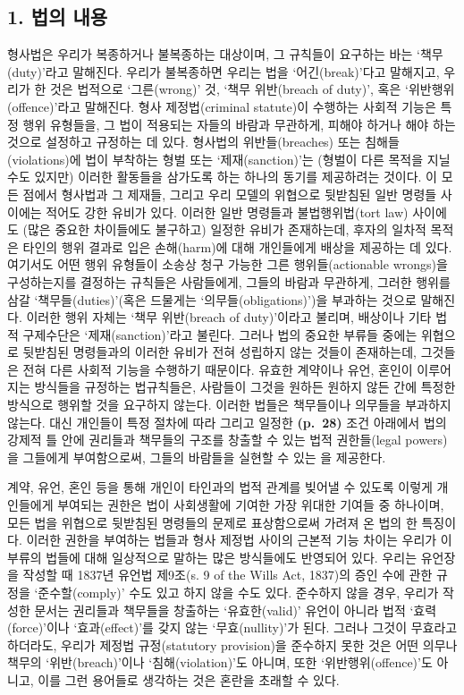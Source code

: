 \subsection{1. 법의 내용}\label{uxbc95uxc758-uxb0b4uxc6a9}

형사법은 우리가 복종하거나 불복종하는 대상이며, 그 규칙들이 요구하는
바는 ‘책무(duty)’라고 말해진다. 우리가 불복종하면 우리는 법을
‘어긴(break)’다고 말해지고, 우리가 한 것은 법적으로 ‘그른(wrong)’ 것,
‘책무 위반(breach of duty)’, 혹은 ‘위반행위(offence)’라고 말해진다. 형사
제정법(criminal statute)이 수행하는 사회적 기능은 특정 행위 유형들을, 그
법이 적용되는 자들의 바람과 무관하게, 피해야 하거나 해야 하는 것으로
설정하고 규정하는 데 있다. 형사법의 위반들(breaches) 또는
침해들(violations)에 법이 부착하는 형벌 또는 ‘제재(sanction)’는 (형벌이
다른 목적을 지닐 수도 있지만) 이러한 활동들을 삼가도록 하는 하나의
동기를 제공하려는 것이다. 이 모든 점에서 형사법과 그 제재들, 그리고 우리
모델의 위협으로 뒷받침된 일반 명령들 사이에는 적어도 강한 유비가 있다.
이러한 일반 명령들과 불법행위법(tort law) 사이에도 (많은 중요한
차이들에도 불구하고) 일정한 유비가 존재하는데, 후자의 일차적 목적은
타인의 행위 결과로 입은 손해(harm)에 대해 개인들에게 배상을 제공하는 데
있다. 여기서도 어떤 행위 유형들이 소송상 청구 가능한 그른
행위들(actionable wrongs)을 구성하는지를 결정하는 규칙들은 사람들에게,
그들의 바람과 무관하게, 그러한 행위를 삼갈 ‘책무들(duties)’(혹은
드물게는 ‘의무들(obligations)’)을 부과하는 것으로 말해진다. 이러한 행위
자체는 ‘책무 위반(breach of duty)’이라고 불리며, 배상이나 기타 법적
구제수단은 ‘제재(sanction)’라고 불린다. 그러나 법의 중요한 부류들 중에는
위협으로 뒷받침된 명령들과의 이러한 유비가 전혀 성립하지 않는 것들이
존재하는데, 그것들은 전혀 다른 사회적 기능을 수행하기 때문이다. 유효한
계약이나 유언, 혼인이 이루어지는 방식들을 규정하는 법규칙들은, 사람들이
그것을 원하든 원하지 않든 간에 특정한 방식으로 행위할 것을 요구하지
않는다. 이러한 법들은 책무들이나 의무들을 부과하지 않는다. 대신 개인들이
특정 절차에 따라 그리고 일정한 \textbf{(p.~28)} 조건 아래에서 법의
강제적 틀 안에 권리들과 책무들의 구조를 창출할 수 있는 법적 권한들(legal
powers)을 그들에게 부여함으로써, 그들의 바람들을 실현할 수 있는
을 제공한다.

계약, 유언, 혼인 등을 통해 개인이 타인과의 법적 관계를 빚어낼 수 있도록
이렇게 개인들에게 부여되는 권한은 법이 사회생활에 기여한 가장 위대한
기여들 중 하나이며, 모든 법을 위협으로 뒷받침된 명령들의 문제로
표상함으로써 가려져 온 법의 한 특징이다. 이러한 권한을 부여하는 법들과
형사 제정법 사이의 근본적 기능 차이는 우리가 이 부류의 법들에 대해
일상적으로 말하는 많은 방식들에도 반영되어 있다. 우리는 유언장을 작성할
때 1837년 유언법 제9조(s. 9 of the Wills Act, 1837)의 증인 수에 관한
규정을 ‘준수할(comply)’ 수도 있고 하지 않을 수도 있다. 준수하지 않을
경우, 우리가 작성한 문서는 권리들과 책무들을 창출하는 ‘유효한(valid)’
유언이 아니라 법적 ‘효력(force)’이나 ‘효과(effect)’를 갖지 않는
‘무효(nullity)’가 된다. 그러나 그것이 무효라고 하더라도, 우리가 제정법
규정(statutory provision)을 준수하지 못한 것은 어떤 의무나 책무의
‘위반(breach)’이나 ‘침해(violation)’도 아니며, 또한
‘위반행위(offence)’도 아니고, 이를 그런 용어들로 생각하는 것은 혼란을
초래할 수 있다.

